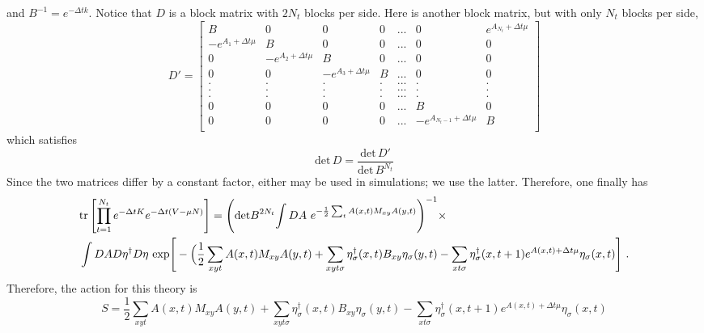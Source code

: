 and $B^{-1} = e^{-\Delta t k}$. Notice that $D$ is a block matrix with $2N_t$ blocks per side. Here is another block matrix, but with only $N_t$ blocks per side,
\begin{equation}
D' = \begin{bmatrix}
B & 0 & 0 & 0 & ... & 0 & e^{A_{N_t}+ \Delta t \mu} \\
-e^{A_1+ \Delta t \mu} & B & 0 & 0 & ... & 0 & 0 \\
0 & -e^{A_2+ \Delta t \mu} & B & 0 & ... & 0 & 0 \\
0 & 0 & -e^{A_3+ \Delta t \mu} & B & ... & 0 & 0 \\
. & . & . & . & ... & . & . \\
. & . & . & . & ... & . & . \\
. & . & . & . & ... & . & . \\
0 & 0 & 0 & 0 & ... & B & 0 \\
0 & 0 & 0 & 0 & ... & -e^{A_{N_t-1}+ \Delta t \mu} & B \\
\end{bmatrix}
\end{equation} 
which satisfies
\begin{equation}
\text{det}\, D = \frac{ \text{det}\, D' }{ \text{det}\, B^{N_t} }
\end{equation}
Since the two matrices differ by a constant factor, either may be used in simulations; we use the latter. Therefore, one finally has
\begin{align*}
& \text{tr}\left[\prod_{t=1}^{N_t} e^{-\Delta t K }  e^{-\Delta t (V - \mu N)}  \right] = \Bigg( {\text{det} B}^{2N_t} {\int DA ~ e^{-\frac{1}{2} \sum_t {A}(x,t) M_{xy} A(y,t)}} \Bigg)^{-1} \times \\
&
\int DA D\eta^{\dagger} D \eta ~ \text{exp}\Bigg[-\Big( \frac{1}{2} \sum_{x y t} A(x,t) M_{xy} A(y,t) + \sum_{x y t \sigma}\eta_{\sigma}^{\dagger}(x,t) B_{x y} \eta_{\sigma}(y,t) - \sum_{x t \sigma}\eta_{\sigma}^{\dagger}(x,t+1) e^{A(x,t) + \Delta t \mu} \eta_{\sigma}(x,t) \Bigg] 
~.
\end{align*}
Therefore, the action for this theory is 
\begin{equation}
S =  \frac{1}{2} \sum_{x y t} A(x,t) M_{xy} A(y,t) + \sum_{x y t \sigma}\eta_{\sigma}^{\dagger}(x,t) B_{x y} \eta_{\sigma}(y,t) - \sum_{x t \sigma}\eta_{\sigma}^{\dagger}(x,t+1) e^{A(x,t) + \Delta t \mu} \eta_{\sigma}(x,t)
\end{equation}


